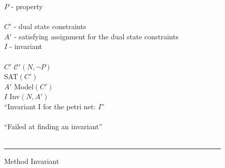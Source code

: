 \begin{figure}
\begin{minipage}[t]{.94\columnwidth}
    \tabT $P$ - property \\
    \algVars\\
    \tabT $C'$ - dual state constraints \\
    \tabT $A'$ - satisfying assignment for the dual state constraints \\
    \tabT $I$ - invariant \\
    \algBegin\\
    \tabT $C'$ \algAssgn $\mathcal C'(N, \neg P)$ \\
    \tabT \algIf SAT$(C')$ \algThen \\
    \tabTT $A'$ \algAssgn Model$(C')$ \\
    \tabTT $I$ \algAssgn Inv$(N, A')$ \\
    \tabTT \algReturn ``Invariant I for the petri net: $I$'' \\
    \tabT \algElse \\
    \tabTT \algReturn ``Failed at finding an invariant'' \\
    \tabT \algFi \\
    \algEnd
  \end{minipage}
  \vspace{1.5ex}
  \hrule
  \caption{Method Invariant}
  \label{fig_method_invariant}
\end{figure}

